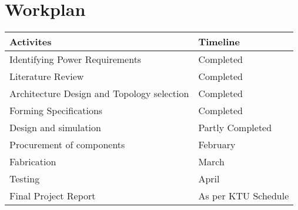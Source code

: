 \chapter{Workplan}
\begin{table}[]
	\begin{tabular}{|l|l|}
		\hline
		\bf{Activites}                                  & \bf{Timeline}            \\ \hline
		Identifying Power Requirements             & Completed           \\ \hline
		Literature Review                          & Completed           \\ \hline
		Architecture Design and Topology selection & Completed           \\ \hline
		Forming Specifications                     & Completed           \\ \hline
		Design and simulation                      & Partly Completed    \\ \hline
		Procurement of components                  & February            \\ \hline
		Fabrication                                & March               \\ \hline
		Testing                                    & April               \\ \hline
		Final Project Report                       & As per KTU Schedule \\ \hline
	\end{tabular}
\end{table}
